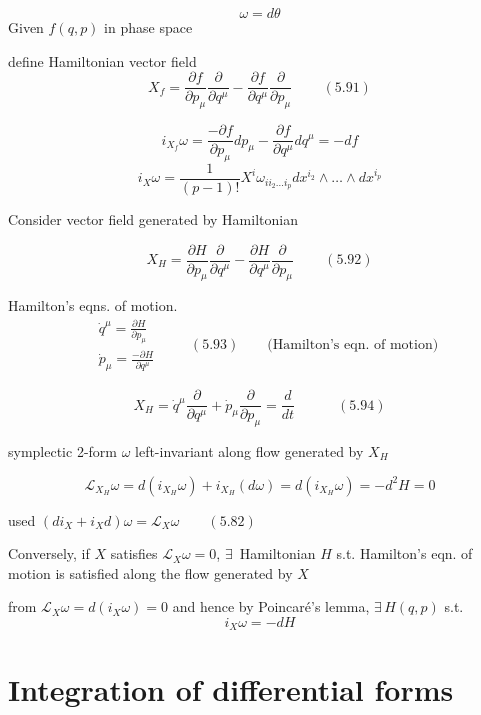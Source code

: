 \documentclass{book}
\begin{document}
\[
\omega = d\theta
\]
Given $f(q,p)$ in phase space

define Hamiltonian vector field 
\[
X_f = \frac{ \partial f}{ \partial p_{\mu}} \frac{ \partial }{ \partial q^{\mu} } - \frac{ \partial f}{ \partial q^{\mu} } \frac{ \partial }{ \partial p_{\mu} } \quad \quad \, (5.91)
\]

\[
i_{X_f} \omega = \frac{ - \partial f}{ \partial p_{\mu}} dp_{\mu} - \frac{ \partial f}{ \partial q^{\mu} } dq^{\mu} = -df
\]
\[
i_X \omega = \frac{1}{ (p-1)!} X^i \omega_{ ii_2 \dots i_p} dx^{i_2} \wedge \dots \wedge dx^{i_p}
\]

Consider vector field generated by Hamiltonian

\begin{equation}
  X_H = \frac{ \partial H }{ \partial p_{\mu}} \frac{ \partial }{ \partial q^{\mu} } - \frac{ \partial H}{ \partial q^{\mu} } \frac{ \partial }{ \partial p_{\mu} } \quad \quad \, (5.92)
\end{equation}

Hamilton's eqns. of motion.
\[
\begin{aligned}
  & \dot{q}^{\mu} = \frac{ \partial H}{ \partial p_{\mu} } \\
  & \dot{p}_{\mu} = \frac{ - \partial H}{ \partial q^{\mu }} 
\end{aligned} \quad \quad \, (5.93) \quad \quad \text{(Hamilton's eqn. of motion)}
\]

\begin{equation}
X_H = \dot{q}^{\mu} \frac{ \partial }{ \partial q^{\mu} } + \dot{p}_{\mu} \frac{ \partial }{ \partial p_{\mu} } = \frac{d}{dt} \quad \quad \quad (5.94)
\end{equation}

symplectic 2-form $\omega$ left-invariant along flow generated by $X_H$

\[
\mathcal{L}_{X_H}\omega = d(i_{X_H} \omega ) + i_{X_H}(d\omega) = d(i_{X_H} \omega ) = - d^2 H = 0 
\]

used $(di_X + i_X d) \omega = \mathcal{L}_X \omega \quad \quad (5.82)$ 

Conversely, if $X$ satisfies $\mathcal{L}_X \omega=0$, $\exists \, $ Hamiltonian $H$ s.t. Hamilton's eqn. of motion is satisfied along the flow generated by $X$

from $\mathcal{L}_X \omega = d(i_X \omega ) = 0$ and hence by Poincar\'{e}'s lemma, $\exists \,  H(q,p)$ s.t. 
\[
i_X \omega = -dH
\]


\section{ Integration of differential forms }
\end{document}
